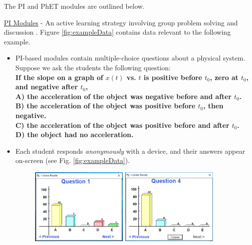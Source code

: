 \documentclass[../../../main.tex]{subfiles}
\begin{document}
The PI and PhET modules are outlined below.
\\
\vspace{0.15cm}

\underline{PI Modules} - An active learning strategy involving group problem solving and discussion \cite{mazur2013peer} \cite{AAPTPI} \cite{PhysPort}.  Figure \ref{fig:exampleData} contains data relevant to the following example.
\begin{itemize}
\item PI-based modules contain multiple-choice questions about a physical system.  Suppose we ask the students the following question: \\ \vspace{0.5cm} \textbf{If the slope on a graph of $x(t)$ vs. $t$ is positive before $t_0$, zero at $t_0$, and negative after $t_0$, \\ \vspace{0.5cm} A) the acceleration of the object was negative before and after $t_0$.  \\ B) the acceleration of the object was positive before $t_0$, then negative. \\ C) the acceleration of the object was positive before and after $t_0$. \\ D) the object had no acceleration.}
\item Each student responds \textit{anonymously} with a device, and their answers appear on-screen (see Fig. \ref{fig:exampleData}).
\begin{figure}
\centering
\includegraphics[width=0.45\textwidth,trim=0.15cm 1cm 0.15cm 2cm,clip=true]{figures/FirstData.PNG}
\includegraphics[width=0.45\textwidth,trim=0.15cm 1cm 0.15cm 2cm,clip=true]{figures/SecondData.PNG}

\end{figure}
\end{itemize}
\end{document}
